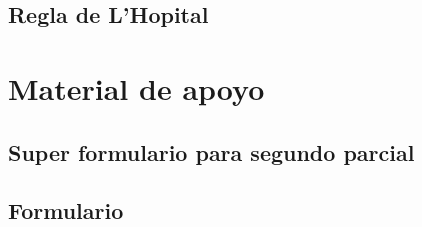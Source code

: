 \documentclass{book}
\begin{document}
\chapter{Regla de L'Hopital}


\part{Material de apoyo}

\chapter{Super formulario para segundo parcial}


\chapter{Formulario}


\end{document}
